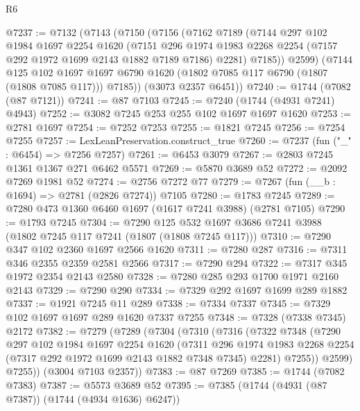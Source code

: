 \begin{lexlean}{R6}
\begin{coremodule}
@7237 := @7132
    (@7143
      (@7150
        (@7156
          (@7162
            @7189
            (@7144
              @297
              @102
              @1984
              @1697
              @2254
              @1620
              (@7151
                @296
                @1974
                @1983
                @2268
                @2254
                (@7157 @292 @1972 @1699 @2143 @1882 @7189 @7186)
                @2281)
              @7185))
          @2599)
        (@7144
          @125
          @102
          @1697
          @1697
          @6790
          @1620
          (@1802 @7085 @117 @6790 (@1807 (@1808 @7085 @117)))
          @7185))
      (@3073 @2357 @6451))
@7240 := @1744 (@7082 (@87 @7121))
@7241 := @87 @7103
@7245 := @7240 (@1744 (@4931 @7241) @4943)
@7252 := @3082 @7245 @253 @255 @102 @1697 @1697 @1620
@7253 := @2781 @1697
@7254 := @7252 @7253
@7255 := @1821 @7245
@7256 := @7254 @7255
@7257 := LexLeanPreservation.construct_true
@7260 := @7237 (fun ("_" : @6454) => @7256 @7257)
@7261 := @6453 @3079
@7267 := @2803 @7245 @1361 @1367 @271 @6462 @5571
@7269 := @5870 @3689 @52
@7272 := @2092 @7269 @1981 @52
@7274 := @2756 @7272 @77
@7279 := @7267 (fun (__b : @1694) => @2781 (@2826 @7274)) @7105
@7280 := @1783 @7245
@7289 := @7280 @473 @1360 @6460 @1697 (@1617 @7241 @3988) (@2781 @7105)
@7290 := @1793 @7245
@7304 := @7290 @125 @532 @1697 @3686 @7241 @3988 (@1802 @7245 @117 @7241 (@1807 (@1808 @7245 @117)))
@7310 := @7290 @347 @102 @2360 @1697 @2566 @1620
@7311 := @7280 @287
@7316 := @7311 @346 @2355 @2359 @2581 @2566
@7317 := @7290 @294
@7322 := @7317 @345 @1972 @2354 @2143 @2580
@7328 := @7280 @285 @293 @1700 @1971 @2160 @2143
@7329 := @7290 @290
@7334 := @7329 @292 @1697 @1699 @289 @1882
@7337 := @1921 @7245 @11 @289
@7338 := @7334 @7337
@7345 := @7329 @102 @1697 @1697 @289 @1620 @7337 @7255
@7348 := @7328 (@7338 @7345) @2172
@7382 := @7279
    (@7289
      (@7304
        (@7310
          (@7316
            (@7322
              @7348
              (@7290
                @297
                @102
                @1984
                @1697
                @2254
                @1620
                (@7311
                  @296
                  @1974
                  @1983
                  @2268
                  @2254
                  (@7317 @292 @1972 @1699 @2143 @1882 @7348 @7345)
                  @2281)
                @7255))
            @2599)
          @7255))
      (@3004 @7103 @2357))
@7383 := @87 @7269
@7385 := @1744 (@7082 @7383)
@7387 := @5573 @3689 @52
@7395 := @7385 (@1744 (@4931 (@87 @7387)) (@1744 (@4934 @1636) @6247))

\end{coremodule}
\end{lexlean}
